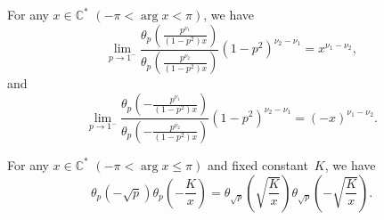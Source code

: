 \documentclass[pdftex]{sigma}
\begin{document}
\begin{proposition}\label{propo1}
 For any $x\in\mathbb{C}^*$ $(-\pi <\arg x<\pi )$, we have
\[\lim_{p\to 1^-}\frac{\theta_p\left(\frac{p^{\nu_1}}{(1-p^2)x}\right)}{\theta_p\left(\frac{p^{\nu_2}}{(1-p^2)x}\right)}\left(1-p^2\right)^{\nu_2-\nu_1}=x^{\nu_1-\nu_2},\]and
\[
\lim_{p\to 1^-}\frac{\theta_p\left(-\frac{p^{\nu_1}}{(1-p^2)x}\right)}{\theta_p\left(-\frac{p^{\nu_2}}{(1-p^2)x}\right)}\left(1-p^2\right)^{\nu_2-\nu_1}=(-x)^{\nu_1-\nu_2}.
\]
\end{proposition}


\begin{lemma}For any $x\in\mathbb{C}^*$ $(-\pi <\arg x\leq\pi )$ and fixed constant~$K$, we have
\[\theta_p(-\sqrt{p})\theta_p\left(-\frac{K}{x}\right)
=\theta_{\sqrt{p}}\left(\sqrt{\frac{K}{x}}\right)\theta_{\sqrt{p}}\left(-\sqrt{\frac{K}{x}}\right).\]
\end{lemma}
\end{document}
